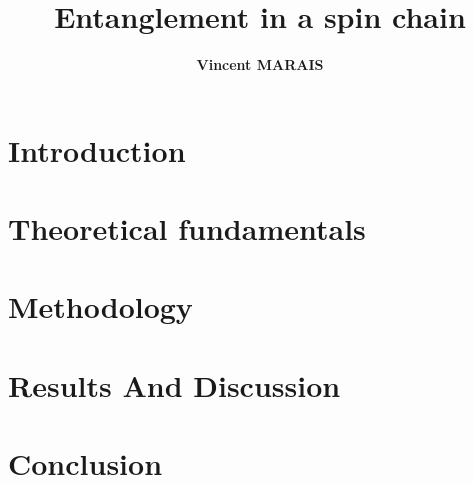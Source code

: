 \documentclass[12pt,a4paper]{article}
\title{Entanglement in a spin chain}
\author{\textbf{Vincent MARAIS}}
\begin{document}
	

\newpage





\newpage
\pagestyle{arabicstyle}
\section*{Introduction}



\newpage

\section{Theoretical fundamentals}



\newpage 
\section{Methodology}




\newpage 

\section{Results And Discussion}


\newpage

\section*{Conclusion}

\newpage 




\newpage 



\end{document}
